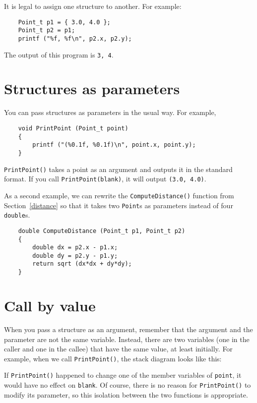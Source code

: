 It is legal to assign one structure to
another.  For example:

\begin{verbatim}
	Point_t p1 = { 3.0, 4.0 };
	Point_t p2 = p1;
	printf ("%f, %f\n", p2.x, p2.y);
\end{verbatim}
%
The output of this program is {\tt 3, 4}.

\section{Structures as parameters}
\label{Structures as parameters}

You can pass structures as parameters in the usual way.  For
example,

\begin{verbatim}
	void PrintPoint (Point_t point) 
	{
		printf ("(%0.1f, %0.1f)\n", point.x, point.y);
	}
\end{verbatim}
%
{\tt PrintPoint()} takes a point as an argument and outputs it in
the standard format.  If you call {\tt PrintPoint(blank)},
it will output {\tt (3.0, 4.0)}.

As a second example, we can rewrite the {\tt ComputeDistance()} function from
Section~\ref{distance} so that it takes two {\tt Point}s as parameters
instead of four {\tt double}s.

\begin{verbatim}
	double ComputeDistance (Point_t p1, Point_t p2) 
	{
		double dx = p2.x - p1.x;
		double dy = p2.y - p1.y;
		return sqrt (dx*dx + dy*dy);
	}
\end{verbatim}

\section{Call by value}
\label{Call by value}

When you pass a structure as an argument, remember that the
argument and the parameter are not the same variable.  Instead,
there are two variables (one in the caller and one in the
callee) that have the same value, at least initially.  For
example, when we call {\tt PrintPoint()}, the stack diagram
looks like this:

\vspace{0.1in}
\centerline{}
\vspace{0.1in}
%
If {\tt PrintPoint()} happened to change one of the member variables
of {\tt point}, it would have no effect on {\tt blank}.  Of course, there
is no reason for {\tt PrintPoint()} to modify its parameter, so this
isolation between the two functions is appropriate.


